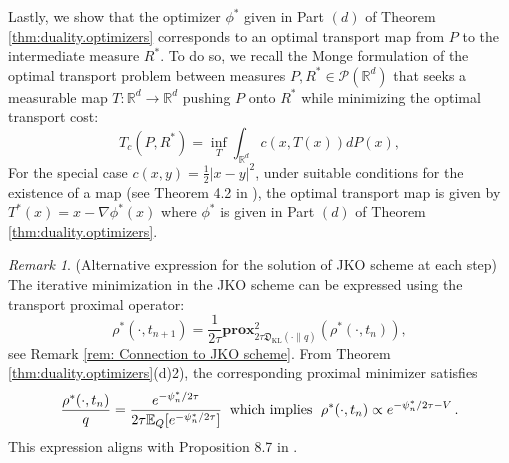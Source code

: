 \documentclass{amsart}
\newcommand{\rb}[1]{#1} %
\theoremstyle{definition}
\theoremstyle{remark}
\newtheorem{remark}[theorem]{Remark}
\numberwithin{equation}{section}
\begin{document}
\rb{Lastly, we show that the optimizer $\phi^*$ given in Part $(d)$ of Theorem \ref{thm:duality.optimizers} corresponds to an optimal transport map from $P$ to the intermediate measure $R^*$. To do so,}
we recall the Monge formulation of the optimal transport problem %
between measures $P,R^*\in \mathcal{P}(\mathbb{R}^d)$ %
that seeks a measurable map $T:\mathbb{R}^d\to \mathbb{R}^d$ pushing $P$ onto $R^*$ while minimizing the optimal transport cost: \begin{equation}\label{MongeProblem}
T_{c}(P,R^*) =  \inf_{T} \int_{\mathbb{R}^d}c(x,T(x))dP(x),
\end{equation}
For the special case $c(x,y)=\frac{1}{2}|x-y|^2$, under suitable conditions for the existence of a map (see Theorem 4.2 in \cite{santambrogio2017euclidean}), the optimal transport map is given by  $T^*(x)=x-\nabla\phi^*(x)$ where $\phi^*$ is given in Part $(d)$ of Theorem \ref{thm:duality.optimizers}. %
\medskip
\begin{remark} (Alternative expression for the solution of JKO scheme at each step) The iterative minimization in the JKO scheme can be expressed using the transport proximal operator: 
 \[
    \rho^*(\cdot,t_{n+1})=\frac{1}{2\tau}\textbf{prox}^2_{2\tau \mathfrak{D_{\mathrm{KL}}}(\cdot\|q)}(\rho^*(\cdot,t_n)),
    \] 
see Remark \ref{rem: Connection to JKO scheme}. From Theorem \ref{thm:duality.optimizers}(d)2), the corresponding proximal minimizer satisfies
\begin{equation}
\frac{\rho^*(\cdot,t_{n})}{q} 
=\frac{e^{- \psi_{n}^*/2\tau}}{2\tau\mathbb{E}_Q[e^{- \psi_{n}^*/2\tau}]}\textrm{\;\;which implies \;} \rho^*(\cdot,t_{n})\propto e^{- \psi_{n}^*/2\tau-V}\,.
\end{equation}
This expression aligns with Proposition 8.7 in \cite{Santambrogio}.
\end{remark}
\end{document}
